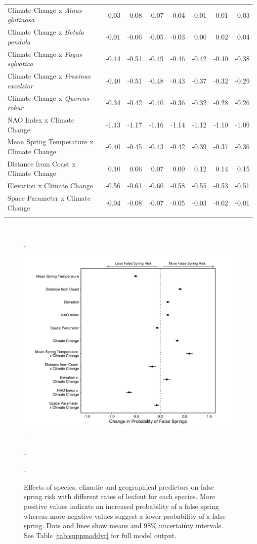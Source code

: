 \documentclass{article}\usepackage[]{graphicx}\usepackage[]{color}
\begin{document}
\begin{longtable}{lrrrrrrr}
  Climate Change
x\textit{ Alnus glutinosa} & -0.03 & -0.08 & -0.07 & -0.04 & -0.01 & 0.01 & 0.03 \\ 
  Climate Change
x\textit{ Betula pendula} & -0.01 & -0.06 & -0.05 & -0.03 & 0.00 & 0.02 & 0.04 \\ 
  Climate Change
x\textit{ Fagus sylvatica} & -0.44 & -0.51 & -0.49 & -0.46 & -0.42 & -0.40 & -0.38 \\ 
  Climate Change
x\textit{ Fraxinus excelsior} & -0.40 & -0.51 & -0.48 & -0.43 & -0.37 & -0.32 & -0.29 \\ 
  Climate Change
x\textit{ Quercus robur} & -0.34 & -0.42 & -0.40 & -0.36 & -0.32 & -0.28 & -0.26 \\ 
  NAO Index x Climate Change & -1.13 & -1.17 & -1.16 & -1.14 & -1.12 & -1.10 & -1.09 \\ 
  Mean Spring 
Temperature x Climate Change & -0.40 & -0.45 & -0.43 & -0.42 & -0.39 & -0.37 & -0.36 \\ 
  Distance from 
Coast x Climate Change & 0.10 & 0.06 & 0.07 & 0.09 & 0.12 & 0.14 & 0.15 \\ 
  Elevation x Climate Change & -0.56 & -0.61 & -0.60 & -0.58 & -0.55 & -0.53 & -0.51 \\ 
  Space Parameter x Climate Change & -0.04 & -0.08 & -0.07 & -0.05 & -0.03 & -0.02 & -0.01 \\ 
   \hline
\hline
\label{tab:suppmodfullleaf}
\end{longtable}

  
  {\begin{figure} [H]
  -\begin{center}
  -\includegraphics[width=12cm]{..//analyses/figures/model_output_98_dvr.png}
  -\caption{Effects of species, climatic and geographical predictors on false spring risk with different rates of leafout for each species. More positive values indicate an increased probability of a false spring whereas more negative values suggest a lower probability of a false spring. Dots and lines show means and 98\% uncertainty intervals. See Table \ref{tab:suppmoddvr} for full model output. }\label{fig:dvr}
  -\end{center}
  -\end{figure}}
  
\end{document}
